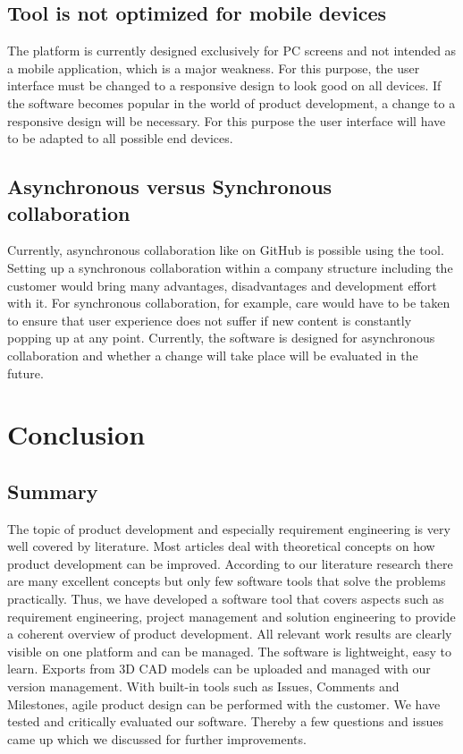 \subsection*{Tool is not optimized for mobile devices}
The platform is currently designed exclusively for PC screens and not intended as a mobile application, which is a major weakness. For this purpose, the user interface must be changed to a responsive design to look good on all devices. If the software becomes popular in the world of product development, a change to a responsive design will be necessary. For this purpose the user interface will have to be adapted to all possible end devices.


\subsection*{Asynchronous versus Synchronous collaboration}
Currently, asynchronous collaboration like on GitHub is possible using the tool. Setting up a synchronous collaboration within a company structure including the customer would bring many advantages, disadvantages and development effort with it. For synchronous collaboration, for example, care would have to be taken to ensure that user experience does not suffer if new content is constantly popping up at any point. Currently, the software is designed for asynchronous collaboration and whether a change will take place will be evaluated in the future.



\section{Conclusion}
\label{sec:conclusion}

\subsection*{Summary} 
The topic of product development and especially requirement engineering is very well covered by literature. Most articles deal with theoretical concepts on how product development can be improved. According to our literature research there are many excellent concepts but only few software tools that solve the problems practically. Thus, we have developed a software tool that covers aspects such as requirement engineering, project management and solution engineering to provide a coherent overview of product development. All relevant work results are clearly visible on one platform and can be managed. The software is lightweight, easy to learn. Exports from 3D CAD models can be uploaded and managed with our version management. With built-in tools such as Issues, Comments and Milestones, agile product design can be performed with the customer. We have tested and critically evaluated our software. Thereby a few questions and issues came up which we discussed for further improvements.

